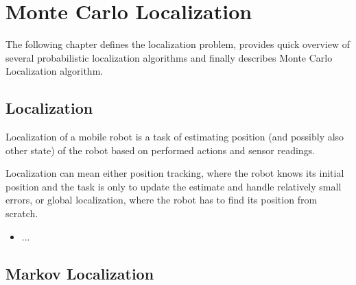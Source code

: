\chapter{Monte Carlo Localization}
\label{chap:mcl}

The following chapter defines the localization problem, provides quick overview
of several probabilistic localization algorithms and finally describes
Monte Carlo Localization algorithm.

\section{Localization}
Localization of a mobile robot is a task of estimating position (and possibly
also other state) of the robot based on performed actions and sensor readings.

Localization can mean either position tracking, where the robot knows its initial
position and the task is only to update the estimate and handle relatively small
errors, or global localization, where the robot has to find its position from scratch.

\begin{itemize}
\item ...
\end{itemize}

\section{Markov Localization}

